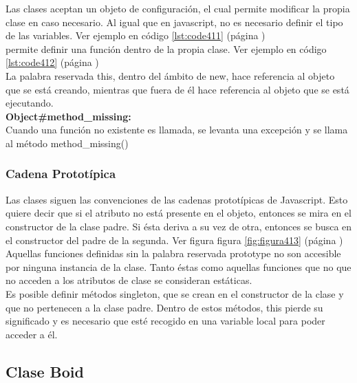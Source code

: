 Las clases aceptan un objeto de configuración, el cual permite modificar la propia clase en caso necesario. Al igual que en javascript, 
no es necesario definir el tipo de las variables. Ver ejemplo en código \ref{lst:code411} (página \pageref{lst:code411})\\

\lluvia{} permite definir una función dentro de la propia clase. Ver ejemplo en código \ref{lst:code412} (página \pageref{lst:code412})\\

La palabra reservada this, dentro del ámbito de new, hace referencia al objeto que se está creando, mientras que fuera de él hace 
referencia al objeto que se está ejecutando.\\

\textbf{Object\#method\_missing:} \\
Cuando una función no existente es llamada, se levanta una excepción y se llama al método method\_missing()



\subsubsection{Cadena Prototípica}
\label{subsubsection:prototipos}

Las clases siguen las convenciones de las cadenas prototípicas de Javascript. Esto quiere decir que si el atributo no está presente en el 
objeto, entonces se mira en el constructor de la clase padre. Si ésta deriva a su vez de otra, entonces se busca en el constructor del 
padre de la segunda. Ver figura figura \ref{fig:figura413} (página \pageref{fig:figura413})\\

Aquellas funciones definidas sin la palabra reservada prototype no son accesible por ninguna instancia de la clase. Tanto éstas como aquellas 
funciones que no que no acceden a los atributos de clase se consideran estáticas.\\

Es posible definir métodos singleton, que se crean en el constructor de la clase y que no pertenecen a la clase padre. Dentro de estos 
métodos, this pierde su significado y es necesario que esté recogido en una variable local para poder acceder a él.\\



\subsection{Clase Boid}
\label{subsection:boid}

